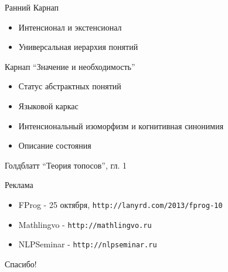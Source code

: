 \documentclass{beamer}
\begin{document}
\begin{frame}{Ранний Карнап}
  \begin{itemize}
    \item Интенсионал и экстенсионал
    \item Универсальная иерархия понятий
  \end{itemize}
\end{frame}

\begin{frame}{Карнап ``Значение и необходимость''}
  \begin{itemize}
    \item Статус абстрактных понятий
    \item Языковой каркас
    \item Интенсиональный изоморфизм и когнитивная синонимия
    \item Описание состояния
  \end{itemize}
\end{frame}

\begin{frame}{Голдблатт ``Теория топосов'', гл. 1}
\end{frame}

\begin{frame}{Реклама}
  \begin{itemize}
    \item FProg - 25 октября, \texttt{http://lanyrd.com/2013/fprog-10}
    \item Mathlingvo - \texttt{http://mathlingvo.ru}
    \item NLPSeminar - \texttt{http://nlpseminar.ru}
  \end{itemize}
\end{frame}


\begin{frame}{}
    \thispagestyle{empty}
    \begin{center}
        {\large Спасибо!}
    \end{center}
\end{frame}


\end{document}
